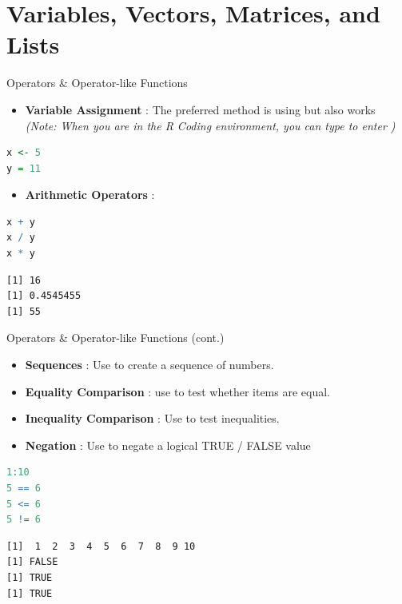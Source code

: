\section{Variables, Vectors, Matrices, and Lists}

\sectionframe

\begin{frame}[fragile]{Operators \& Operator-like Functions}
\begin{itemize}
  \item \textbf{Variable Assignment} : The preferred method is using \code{<-} but \code{=} also works \textit{(Note: When you are in the R Coding environment, you can type  to enter \code{<-})}
\end{itemize}
\begin{lstlisting}[language=R]
x <- 5
y = 11
\end{lstlisting}
\begin{itemize}
  \item \textbf{Arithmetic Operators} : \code{+ - / *}
\end{itemize}
\begin{lstlisting}[language=R]
x + y 
x / y
x * y
\end{lstlisting}
\begin{lstlisting}[style=output]
[1] 16
[1] 0.4545455
[1] 55
\end{lstlisting}
\end{frame}

\begin{frame}[fragile]{Operators \& Operator-like Functions (cont.)}
\begin{itemize}
  \item \textbf{Sequences} : Use \code{:} to create a sequence of numbers.
  \item \textbf{Equality Comparison} : use \code{==} to test whether items are equal.
  \item \textbf{Inequality Comparison} : Use \code{< > <= >=} to test inequalities.
  \item \textbf{Negation} : Use \code{!} to negate a logical TRUE / FALSE value
\end{itemize}
\begin{lstlisting}[language=R]
1:10
5 == 6
5 <= 6
5 != 6
\end{lstlisting}
\begin{lstlisting}[style=output]
 [1]  1  2  3  4  5  6  7  8  9 10
[1] FALSE
[1] TRUE
[1] TRUE
\end{lstlisting}
\end{frame}


